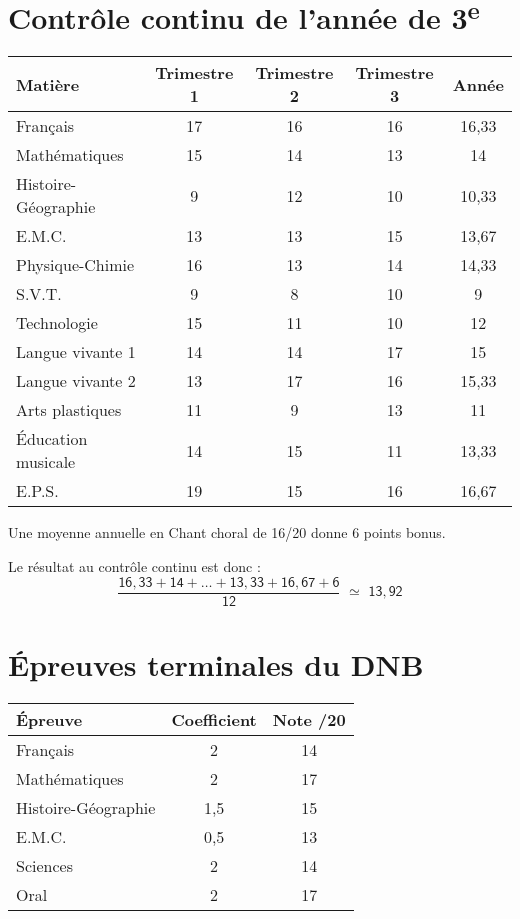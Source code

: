 \documentclass[11pt,a5paper]{article}
\begin{document}
\section*{Contrôle continu de l’année de 3\textsuperscript{e}}
\begin{table}[h!]
{\centering
\renewcommand{\arraystretch}{1.5} 
\begin{tabular}{l c c c c}
\hline
Matière & Trimestre 1 & Trimestre 2 & Trimestre 3 & Année \\
\hline
Français & 17 & 16 & 16 & 16,33 \\
Mathématiques & 15 & 14 & 13 & 14 \\
Histoire-Géographie & 9 & 12 & 10 & 10,33 \\
E.M.C. & 13 & 13 & 15 & 13,67 \\
Physique-Chimie & 16 & 13 & 14 & 14,33 \\
S.V.T. & 9 & 8 & 10 & 9 \\
Technologie & 15 & 11 & 10 & 12 \\
Langue vivante 1 & 14 & 14 & 17 & 15 \\
Langue vivante 2 & 13 & 17 & 16 & 15,33 \\
Arts plastiques & 11 & 9 & 13 & 11 \\
Éducation musicale & 14 & 15 & 11 & 13,33 \\
E.P.S. & 19 & 15 & 16 & 16,67 \\
\hline
\end{tabular}
}
\end{table}

\vspace{1em}
Une moyenne annuelle en Chant choral de 16/20 donne 6 points bonus.

\vspace{1.3em}
Le résultat au contrôle continu est donc :
\[
	\mathsf{
		\dfrac{16,33+14+\ldots+13,33+16,67+6}{12} \,\, \simeq \,\, 13,92
	}
\]


\newpage
\section*{Épreuves terminales du DNB}
\begin{table}[h!]
{\centering
\renewcommand{\arraystretch}{1.5} 
\begin{tabular}{l c c}
\hline
Épreuve & Coefficient & Note /20\\
\hline
Français & 2 & 14 \\
Mathématiques & 2 & 17 \\
Histoire-Géographie & 1,5 & 15 \\
E.M.C. & 0,5 & 13 \\
Sciences & 2 & 14 \\
Oral & 2 & 17 \\
\hline
\end{tabular}
}
\end{table}
\end{document}
